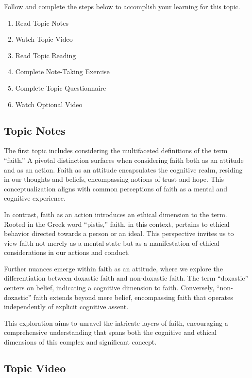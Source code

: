 \documentclass[
]{book}
\providecommand{\tightlist}{%
  \setlength{\itemsep}{0pt}\setlength{\parskip}{0pt}}
\begin{document}
Follow and complete the steps below to accomplish your learning for this topic.

\begin{enumerate}
\def\labelenumi{\arabic{enumi}.}
\tightlist
\item
  Read Topic Notes
\item
  Watch Topic Video
\item
  Read Topic Reading
\item
  Complete Note-Taking Exercise
\item
  Complete Topic Questionnaire
\item
  Watch Optional Video
\end{enumerate}

\hypertarget{topic-notes-4}{%
\subsection*{Topic Notes}\label{topic-notes-4}}

The first topic includes considering the multifaceted definitions of the term ``faith.'' A pivotal distinction surfaces when considering faith both as an attitude and as an action. Faith as an attitude encapsulates the cognitive realm, residing in our thoughts and beliefs, encompassing notions of trust and hope. This conceptualization aligns with common perceptions of faith as a mental and cognitive experience.

In contrast, faith as an action introduces an ethical dimension to the term. Rooted in the Greek word ``pistis,'' faith, in this context, pertains to ethical behavior directed towards a person or an ideal. This perspective invites us to view faith not merely as a mental state but as a manifestation of ethical considerations in our actions and conduct.

Further nuances emerge within faith as an attitude, where we explore the differentiation between doxastic faith and non-doxastic faith. The term ``doxastic'' centers on belief, indicating a cognitive dimension to faith. Conversely, ``non-doxastic'' faith extends beyond mere belief, encompassing faith that operates independently of explicit cognitive assent.

This exploration aims to unravel the intricate layers of faith, encouraging a comprehensive understanding that spans both the cognitive and ethical dimensions of this complex and significant concept.

\hypertarget{topic-video-4}{%
\subsection*{Topic Video}\label{topic-video-4}}
\end{document}
